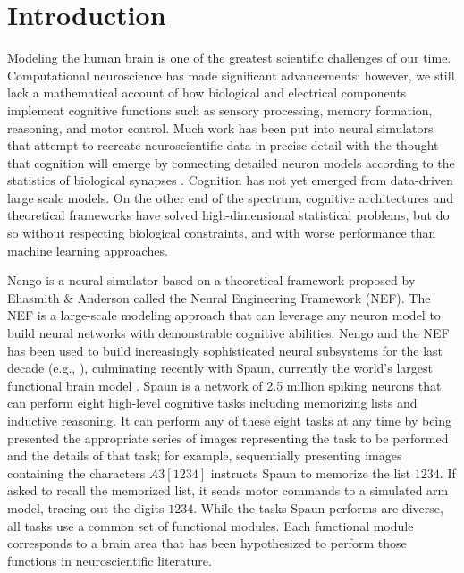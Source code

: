 \documentclass{frontiersSCNS}
\begin{document}
\section{Introduction}

Modeling the human brain
is one of the greatest
scientific challenges of our time.
Computational neuroscience
has made significant advancements;
however, we still lack a mathematical account of
how biological and electrical components
implement cognitive functions such as sensory processing,
memory formation, reasoning, and motor control.
Much work has been put into neural simulators
that attempt to recreate neuroscientific
data in precise detail with the thought that
cognition will emerge by connecting
detailed neuron models according
to the statistics of biological synapses \cite{TODO}. %
Cognition has not yet emerged
from data-driven large scale models.
On the other end of the spectrum,
cognitive architectures \cite{TODO} %
and theoretical frameworks \cite{TODO} %
have solved high-dimensional statistical problems,
but do so without respecting biological constraints,
and with worse performance than machine learning approaches.

Nengo is a neural simulator
based on a theoretical framework proposed
by Eliasmith \& Anderson \citeyearpar{TODO}
called the Neural Engineering Framework
(NEF).
The NEF is a large-scale modeling approach
that can leverage any neuron model
to build neural networks with
demonstrable cognitive abilities.
Nengo and the NEF has been used to build
increasingly sophisticated neural subsystems
for the last decade (e.g., \cite{TODO}),
culminating recently with Spaun,
currently the world's
largest functional brain model \cite{TODO}.
Spaun is a network of 2.5 million spiking neurons
that can perform eight high-level cognitive tasks
including memorizing lists and inductive reasoning.
It can perform any of these eight tasks
at any time by being presented
the appropriate series of images
representing the task to be performed
and the details of that task;
for example, sequentially presenting images
containing the characters $A3[1234]$ instructs Spaun
to memorize the list $1234$.
If asked to recall the memorized list,
it sends motor commands to a simulated arm model,
tracing out the digits $1234$.
While the tasks Spaun performs are diverse,
all tasks use a common set of
functional modules.
Each functional module corresponds
to a brain area that has been hypothesized
to perform those functions
in neuroscientific literature.
\end{document}
